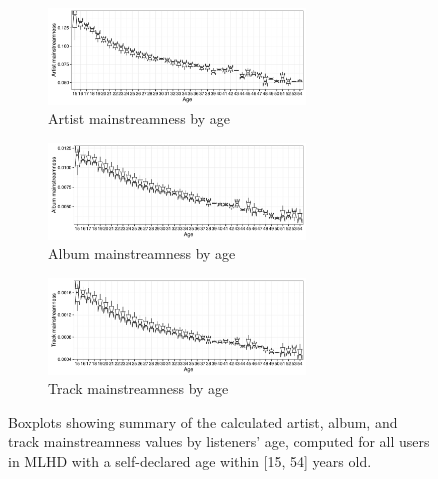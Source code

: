 \graphicspath{{./figs/ch6/}}
\begin{figure}[!t]
	\centering
	\begin{subfigure}[b]{\textwidth}
		\centering
		\includegraphics[width=0.75\textwidth]{artist_mainstreamness.pdf}
        \caption{Artist mainstreamness by age}
        \label{fig:artist_mainstreamness}
	\end{subfigure}

	\begin{subfigure}[b]{\textwidth}
		\centering
		\includegraphics[width=0.75\textwidth]{album_mainstreamness.pdf}
        \caption{Album mainstreamness by age}
        \label{fig:album_mainstreamness}
	\end{subfigure}

	\begin{subfigure}[b]{\textwidth}
		\centering
		\includegraphics[width=0.75\textwidth]{track_mainstreamness.pdf}
        \caption{Track mainstreamness by age}
        \label{fig:track_mainstreamness}
	\end{subfigure}
	\caption[Summary of computed artist, album, and track mainstreamness]{Boxplots showing summary of the calculated artist, album, and track mainstreamness values by listeners' age, computed for all users in MLHD with a self-declared age within [15, 54] years old.}
	\label{fig:mainstreamness_by_age}
\end{figure}

